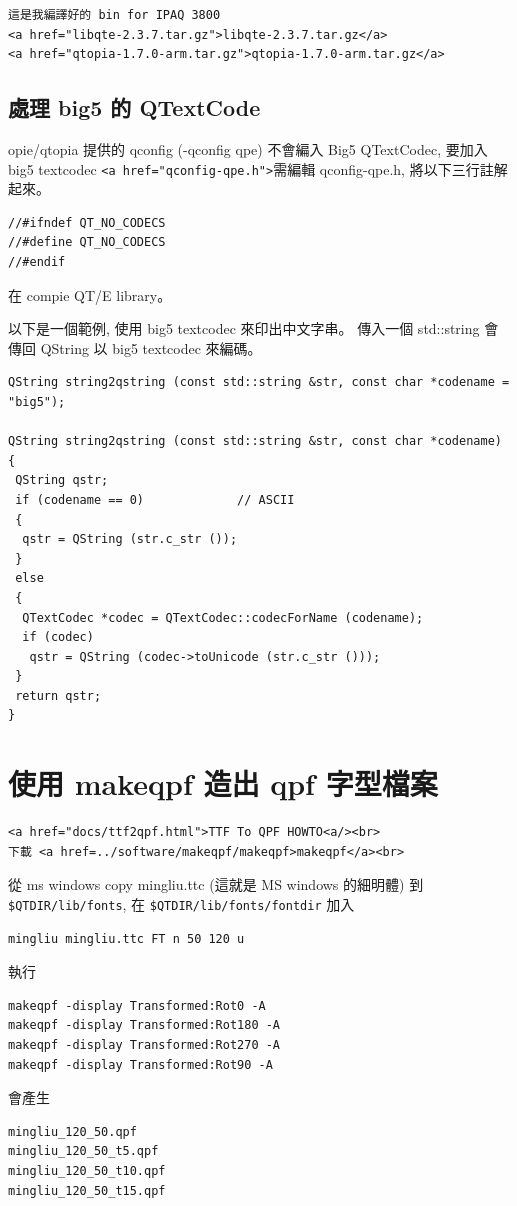 \documentclass[12pt,a4paper]{article}
\begin{document}
\begin{CJK}{UTF8}{bsmi}
\begin{verbatim}
這是我編譯好的 bin for IPAQ 3800
<a href="libqte-2.3.7.tar.gz">libqte-2.3.7.tar.gz</a>
<a href="qtopia-1.7.0-arm.tar.gz">qtopia-1.7.0-arm.tar.gz</a>
\end{verbatim}

\subsection{處理 big5 的 QTextCode}
opie/qtopia 提供的 qconfig (-qconfig qpe) 不會編入 Big5 QTextCodec,
要加入 big5 textcodec \verb+<a href="qconfig-qpe.h">+需編輯 qconfig-qpe.h,
將以下三行註解起來。
\begin{verbatim}
//#ifndef QT_NO_CODECS
//#define QT_NO_CODECS
//#endif
\end{verbatim}
在 compie QT/E library。

以下是一個範例, 使用 big5 textcodec 來印出中文字串。
傳入一個 std::string 會傳回 QString 以 big5 textcodec 來編碼。

\begin{verbatim}
QString string2qstring (const std::string &str, const char *codename = "big5");

QString string2qstring (const std::string &str, const char *codename)
{
 QString qstr;
 if (codename == 0)             // ASCII
 {
  qstr = QString (str.c_str ());
 }
 else
 {
  QTextCodec *codec = QTextCodec::codecForName (codename);
  if (codec)
   qstr = QString (codec->toUnicode (str.c_str ()));
 }
 return qstr;
}  
\end{verbatim}

\section{使用 makeqpf 造出 qpf 字型檔案}

\begin{verbatim}
<a href="docs/ttf2qpf.html">TTF To QPF HOWTO<a/><br>
下載 <a href=../software/makeqpf/makeqpf>makeqpf</a><br>
\end{verbatim}

從 ms windows copy mingliu.ttc (這就是 MS windows 的細明體) 到 \verb+$QTDIR/lib/fonts+, 在 
\verb+$QTDIR/lib/fonts/fontdir+ 加入

\begin{verbatim}
mingliu mingliu.ttc FT n 50 120 u
\end{verbatim}

執行
\begin{verbatim}
makeqpf -display Transformed:Rot0 -A
makeqpf -display Transformed:Rot180 -A
makeqpf -display Transformed:Rot270 -A
makeqpf -display Transformed:Rot90 -A
\end{verbatim}
會產生
\begin{verbatim}
mingliu_120_50.qpf      
mingliu_120_50_t5.qpf
mingliu_120_50_t10.qpf  
mingliu_120_50_t15.qpf
\end{verbatim}


\end{CJK}
\end{document}
